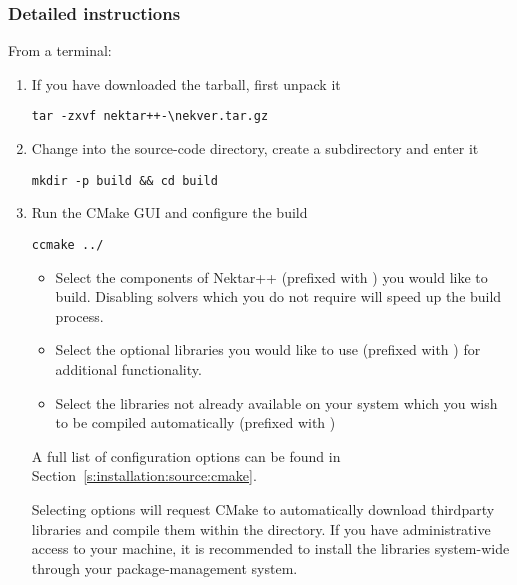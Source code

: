 \subsubsection{Detailed instructions}
From a terminal:
\begin{enumerate}
    \item If you have downloaded the tarball, first unpack it
    \begin{lstlisting}[style=BashInputStyle]
    tar -zxvf nektar++-\nekver.tar.gz
    \end{lstlisting}
    
    \item Change into the source-code directory, create a 
    subdirectory and enter it 
    \begin{lstlisting}[style=BashInputStyle]
    mkdir -p build && cd build
    \end{lstlisting}
    
    \item Run the CMake GUI and configure the build
    \begin{lstlisting}[style=BashInputStyle]
    ccmake ../
    \end{lstlisting}
    \begin{itemize}
        \item Select the components of Nektar++ (prefixed with
        ) you would like to build. Disabling solvers
        which you do not require will speed up the build process.
        \item Select the optional libraries you would like to use (prefixed with
        ) for additional functionality.
        \item Select the libraries not already available on your system which
        you wish to be compiled automatically (prefixed with 
        )
    \end{itemize}
    A full list of configuration options can be found in
    Section~\ref{s:installation:source:cmake}.

    \begin{notebox}
    Selecting  options will request CMake to
    automatically download thirdparty libraries and compile them within the
    \nekpp directory. If you have administrative access to your machine, it is
    recommended to install the libraries system-wide through your
    package-management system.
    \end{notebox}
    

\end{enumerate}
